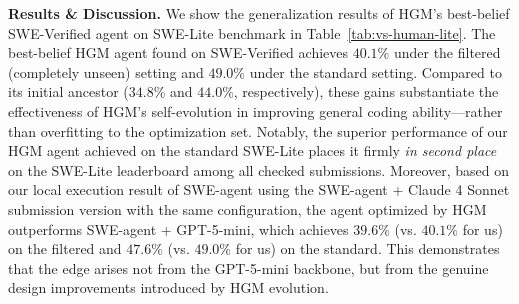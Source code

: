 \documentclass{article}
\begin{document}
\renewcommand{\arraystretch}{1.8}
\begin{table}[t!]
  \centering
  \label{tab:gpt5-vs-human-lite}
  \renewcommand\arraystretch{2}
\end{table}



\textbf{Results \& Discussion.} We show the generalization results of HGM's best-belief SWE-Verified agent on SWE-Lite benchmark in Table~\ref{tab:vs-human-lite}. The best-belief HGM agent found on SWE-Verified achieves $40.1\%$ under the filtered (completely unseen) setting and $49.0\%$ under the standard setting. Compared to its initial ancestor ($34.8\%$ and $44.0\%$, respectively), these gains substantiate the effectiveness of HGM’s self-evolution in improving general coding ability---rather than overfitting to the optimization set. Notably, the superior performance of our HGM agent achieved on the standard SWE-Lite places it firmly \textit{in second place} on the SWE-Lite leaderboard among all checked submissions. Moreover, based on our local execution result of SWE-agent using the SWE-agent + Claude 4 Sonnet submission version with the same configuration, the agent optimized by HGM outperforms SWE-agent + GPT-5-mini, which achieves $39.6\%$ (vs. $40.1\%$ for us) on the filtered and $47.6\%$ (vs. $49.0\%$ for us) on the standard. This demonstrates that the edge arises not from the GPT-5-mini backbone, but from the genuine design improvements introduced by HGM evolution.
\end{document}
